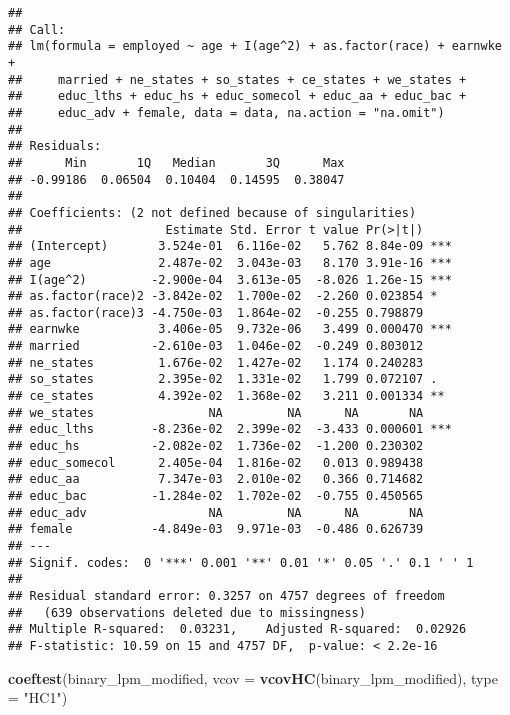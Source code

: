\documentclass[
]{article}
\newenvironment{Shaded}{\begin{snugshade}}{\end{snugshade}}
\newcommand{\AttributeTok}[1]{\textcolor[rgb]{0.13,0.29,0.53}{#1}}
\newcommand{\FunctionTok}[1]{\textcolor[rgb]{0.13,0.29,0.53}{\textbf{#1}}}
\newcommand{\NormalTok}[1]{#1}
\newcommand{\StringTok}[1]{\textcolor[rgb]{0.31,0.60,0.02}{#1}}
\begin{document}
\begin{verbatim}
## 
## Call:
## lm(formula = employed ~ age + I(age^2) + as.factor(race) + earnwke + 
##     married + ne_states + so_states + ce_states + we_states + 
##     educ_lths + educ_hs + educ_somecol + educ_aa + educ_bac + 
##     educ_adv + female, data = data, na.action = "na.omit")
## 
## Residuals:
##      Min       1Q   Median       3Q      Max 
## -0.99186  0.06504  0.10404  0.14595  0.38047 
## 
## Coefficients: (2 not defined because of singularities)
##                    Estimate Std. Error t value Pr(>|t|)    
## (Intercept)       3.524e-01  6.116e-02   5.762 8.84e-09 ***
## age               2.487e-02  3.043e-03   8.170 3.91e-16 ***
## I(age^2)         -2.900e-04  3.613e-05  -8.026 1.26e-15 ***
## as.factor(race)2 -3.842e-02  1.700e-02  -2.260 0.023854 *  
## as.factor(race)3 -4.750e-03  1.864e-02  -0.255 0.798879    
## earnwke           3.406e-05  9.732e-06   3.499 0.000470 ***
## married          -2.610e-03  1.046e-02  -0.249 0.803012    
## ne_states         1.676e-02  1.427e-02   1.174 0.240283    
## so_states         2.395e-02  1.331e-02   1.799 0.072107 .  
## ce_states         4.392e-02  1.368e-02   3.211 0.001334 ** 
## we_states                NA         NA      NA       NA    
## educ_lths        -8.236e-02  2.399e-02  -3.433 0.000601 ***
## educ_hs          -2.082e-02  1.736e-02  -1.200 0.230302    
## educ_somecol      2.405e-04  1.816e-02   0.013 0.989438    
## educ_aa           7.347e-03  2.010e-02   0.366 0.714682    
## educ_bac         -1.284e-02  1.702e-02  -0.755 0.450565    
## educ_adv                 NA         NA      NA       NA    
## female           -4.849e-03  9.971e-03  -0.486 0.626739    
## ---
## Signif. codes:  0 '***' 0.001 '**' 0.01 '*' 0.05 '.' 0.1 ' ' 1
## 
## Residual standard error: 0.3257 on 4757 degrees of freedom
##   (639 observations deleted due to missingness)
## Multiple R-squared:  0.03231,    Adjusted R-squared:  0.02926 
## F-statistic: 10.59 on 15 and 4757 DF,  p-value: < 2.2e-16
\end{verbatim}

\begin{Shaded}
\begin{Highlighting}[]
\FunctionTok{coeftest}\NormalTok{(binary\_lpm\_modified, }\AttributeTok{vcov =} \FunctionTok{vcovHC}\NormalTok{(binary\_lpm\_modified), }\AttributeTok{type =} \StringTok{"HC1"}\NormalTok{)}
\end{Highlighting}
\end{Shaded}
\end{document}
